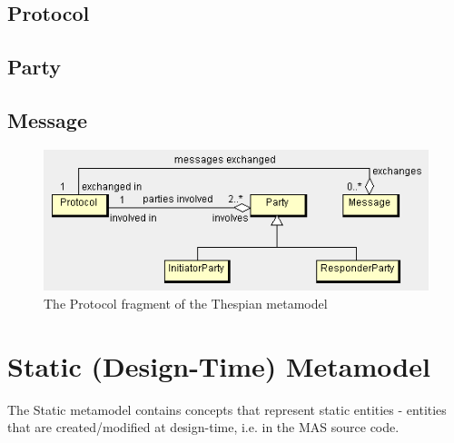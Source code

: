 \subsection*{Protocol}

\subsection*{Party}

\subsection*{Message}

\begin{figure}[ht]
	\centering
	\includegraphics[width=\textwidth]{images/thespian-protocol-metamodel.png}
	\caption{The Protocol fragment of the Thespian metamodel}
	\label{figure:thespian-protocol-metamodel}
\end{figure}

\section{Static (Design-Time) Metamodel}	

The Static metamodel contains concepts that represent static entities - entities that are created/modified at design-time, i.e. in the MAS source code.

